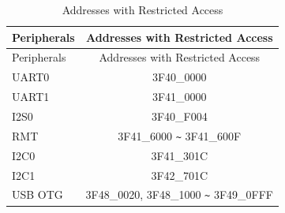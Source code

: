 \begin{longtable}[c]{ |p{2.5cm}|c| }

  \caption{Addresses with Restricted Access}
  \label{table:Special_Registers_for_Dport_Bus}
  \\\hline
  \rowcolor{lightgray}
  {Peripherals} & {Addresses with Restricted Access} \\\hline
  \endfirsthead

  \hline
  \rowcolor{lightgray}
   {Peripherals} & {Addresses with Restricted Access} \\\hline
  \endhead
  \endfoot
  \hline
  \endlastfoot

    UART0     & \hexprefix{}3F40\_0000                                      \\\hline
    UART1     & \hexprefix{}3F41\_0000                                      \\\hline
    I2S0      & \hexprefix{}3F40\_F004                                      \\\hline
    RMT       & \hexprefix{}3F41\_6000 \verb+~+ \hexprefix{}3F41\_600F                \\\hline
    I2C0      & \hexprefix{}3F41\_301C                                      \\\hline
    I2C1      & \hexprefix{}3F42\_701C                                      \\\hline
    USB OTG   & \hexprefix{}3F48\_0020, \hexprefix{}3F48\_1000 \verb+~+ \hexprefix{}3F49\_0FFF  \\

\end{longtable}
